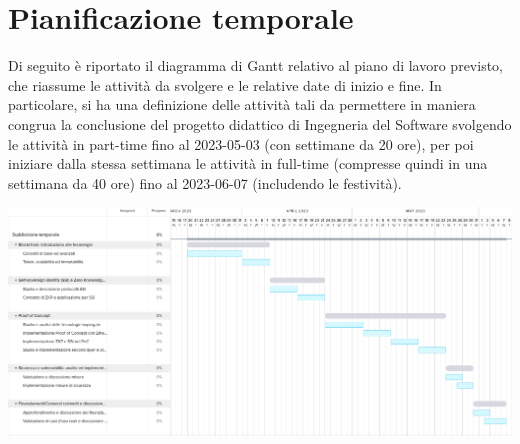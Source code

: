 \section*{Pianificazione temporale}
Di seguito è riportato il diagramma di Gantt relativo al piano di lavoro previsto, che riassume le attività da svolgere e le relative date di inizio e fine.
In particolare, si ha una definizione delle attività tali da permettere in maniera congrua la conclusione
del progetto didattico di Ingegneria del Software svolgendo le attività in part-time fino al 2023-05-03 (con settimane da 20 ore), 
per poi iniziare dalla stessa settimana le attività in full-time (compresse quindi in una settimana da 40 ore) fino al 2023-06-07 (includendo le festività).
\begin{center}
	\includegraphics[width=18cm]{img/gantt.png}
\end{center}
